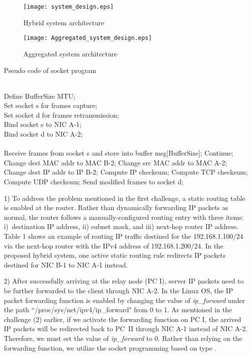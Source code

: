 \documentclass[10pt,journal]{IEEEtran}
\begin{document}
\begin{figure}
\centering
\texttt{[image: system\_design.eps]}
\caption{Hybrid system architecture}
\label{fig_system_design}
\end{figure}

\begin{figure}
\centering
\texttt{[image: Aggregated\_system\_design.eps]}
\caption{Aggregated system architecture}
\label{fig_Aggregated_system_design}
\end{figure}

\begin{algorithm}
\caption{Pseudo code of socket program}\label{algorithm}
\begin{algorithmic}[1]
\REQUIRE~~\\
Define BufferSize MTU;\\
Set socket s for frames capture;\\
Set socket d for frames retransmission;\\
Bind socket s to NIC A-1;\\
Bind socket d to NIC A-2;\\
\ENSURE~~\\
\STATE Receive frames from socket s and store into buffer msg[BufferSize];
\STATE Continue;
\ENDIF
{}
\STATE Change dest MAC addr to MAC B-2;
\STATE Change src MAC addr to MAC A-2;
\STATE Change dest IP addr to IP B-2;
\STATE Compute IP checksum;
\STATE Compute TCP checksum;
\STATE Compute UDP checksum;
\STATE Send modified frames to socket d;
\ENDIF
\ENDWHILE
\end{algorithmic}
\end{algorithm}

1) To address the problem mentioned in the first challenge, a static routing table is enabled at the router. Rather than dynamically forwarding IP packets as normal, the router follows a manually-configured routing entry with three items: i)~destination IP address, ii) subnet mask, and iii) next-hop router IP address. Table 1 shows an example of routing IP traffic destined for the 192.168.1.100/24 via the next-hop router with the IPv4 address of 192.168.1.200/24. In the proposed hybrid system, one active static routing rule redirects IP packets destined for NIC B-1 to NIC A-1 instead.

2) After successfully arriving at the relay node (PC I), server IP packets need to be further forwarded to the client through NIC A-2. In the Linux OS, the IP packet forwarding function is enabled by changing the value of {\em ip\_forward} under the path ``/proc/sys/net/ipv4/ip\_forward" from 0 to 1. As mentioned in the challenge (2) earlier, if we activate the forwarding function on PC I, the arrived IP packets will be redirected back to PC~II through NIC A-1 instead of NIC A-2. Therefore, we must set the value of {\em ip\_forward} to 0. Rather than relying on the forwarding function, we utilize the socket programming based on  type \cite{senie2002using}.
\end{document}
